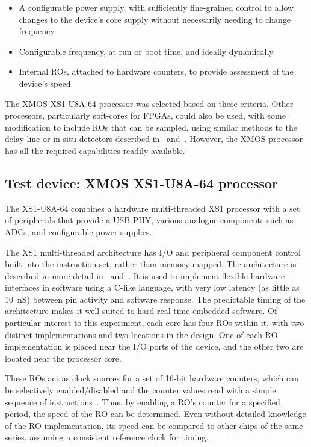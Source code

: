 \documentclass[a4paper,twocolumn,DIV=16]{scrartcl}
\begin{document}
\begin{itemize}
\item A configurable power supply, with sufficiently fine-grained control to
allow changes to the device's core supply without necessarily needing to change
frequency.
\item Configurable frequency, at run or boot time, and ideally dynamically.
\item Internal ROs, attached to hardware counters, to provide assessment of the
device's speed.
\end{itemize}

The XMOS XS1-U8A-64 processor was selected based on these criteria. Other
processors, particularly soft-cores for FPGAs, could also be used, with some
modification to include ROs that can be sampled, using similar methods to the
delay line or in-situ detectors described in~\cite{Nabina2012}
and~\cite{Nunez-Yanez2013}.  However, the XMOS processor has all the required
capabilities readily available.


\subsection{Test device: XMOS XS1-U8A-64 processor}

The XS1-U8A-64 combines a hardware multi-threaded XS1 processor with a set of
peripherals that provide a USB PHY, various analogue components such as ADCs,
and configurable power supplies. 

The XS1 multi-threaded architecture has I/O and peripheral component control
built into the instruction set, rather than memory-mapped. The architecture is
described in more detail in~\cite{XMOS2009a} and~\cite{XS1Lsys2008}. It is used
to implement flexible hardware interfaces in software using a C-like language,
with very low latency (as little as 10~nS) between pin activity and software
response. The predictable timing of the architecture makes it well suited to
hard real time embedded software. Of particular interest to this experiment,
each core has four ROs within it, with two distinct implementations and two
locations in the design.  One of each RO implementation is placed near the I/O
ports of the device, and the other two are located near the processor core.

These ROs act as clock sources for a set of 16-bit hardware counters, which can
be selectively enabled/disabled and the counter values read with a simple
sequence of instructions~\cite{XMOS2010a}. Thus, by enabling a RO's counter for
a specified period, the speed of the RO can be determined. Even without detailed
knowledge of the RO implementation, its speed can be compared to other chips of
the same series, assuming a consistent reference clock for timing.
\end{document}
